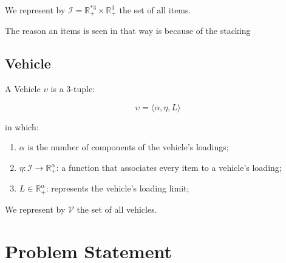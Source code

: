 \documentclass{article}
\newcommand{\realpositive}{\ensuremath{\mathbb{R}_{+}^{*}}\xspace}
\newcommand{\nrealnonnegative}[1]{\ensuremath{\mathbb{R}_{+}^{#1}}\xspace}
\newcommand{\nrealpositive}[1]{\ensuremath{\mathbb{R}_{+}^{*#1}}\xspace}
\newcommand{\tuple}[1]{#1-tuple\xspace}
\newcommand{\OrderedSet}[1]{\ensuremath{\langle#1\rangle}\xspace}
\newcommand{\function}[3]{\ensuremath{#1: #2 \rightarrow #3}\xspace}
\newcommand{\vehicleO}{\ensuremath{\upsilon}\xspace}
\newcommand{\vehicleSet}{\mathcal{V}\xspace}
\newcommand{\loadingFunction}{\ensuremath{\eta}\xspace}
\newcommand{\loadingLimit}{\ensuremath{L}\xspace}
\newcommand{\nAxles}{\ensuremath{\alpha}\xspace}
\newcommand{\loadingCodomain}{\nrealnonnegative{\nAxles}}
\newcommand{\itemSet}{\ensuremath{\mathcal{I}}\xspace}
\newcommand{\itemDomain}{\ensuremath{\nrealpositive{3} \times \nrealnonnegative{3}}\xspace}
\newcommand{\containero}{\ensuremath{c}\xspace}
\newcommand{\lx}{\ensuremath{\chi}\xspace}
\newcommand{\ly}{\ensuremath{\psi}\xspace}
\newcommand{\lz}{\ensuremath{\omega}\xspace}
\newcommand{\px}{\ensuremath{x}\xspace}
\newcommand{\py}{\ensuremath{y}\xspace}
\newcommand{\pz}{\ensuremath{z}\xspace}
\begin{document}
We represent by $\itemSet = \itemDomain$ the set of all items.

The reason an items is seen in that way is because of the stacking

%
%
%
%

\subsection{Vehicle}

A Vehicle \vehicleO is a \tuple{3}:

\begin{equation}
	\label{definition:vehicle}
	\vehicleO = \OrderedSet{
		\nAxles,
		\loadingFunction,
		\loadingLimit
	}
\end{equation}

in which:

\begin{enumerate}
	\item $\nAxles$ is the number of components of the vehicle's loadings;
	\item $\function{\loadingFunction}{\itemSet}{\loadingCodomain}$: a function that associates every item to a vehicle's loading;
	\item $\loadingLimit \in \loadingCodomain$: represents the vehicle's loading limit;
\end{enumerate}

We represent by $\vehicleSet$ the set of all vehicles.

\section{Problem Statement}
\end{document}
